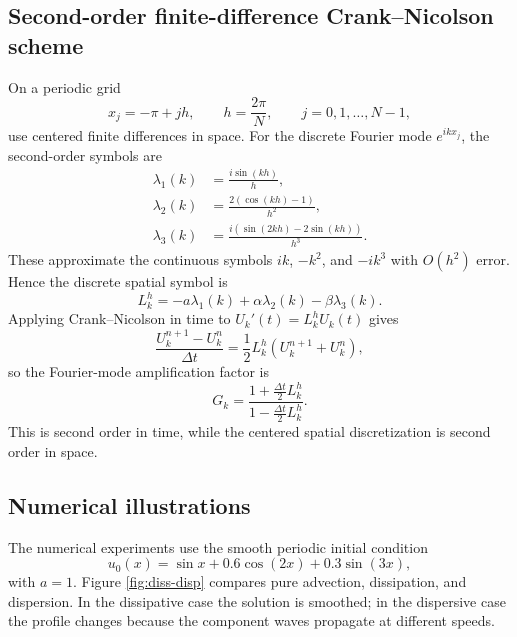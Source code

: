 \documentclass[11pt]{article}
\begin{document}
\subsection{Second-order finite-difference Crank--Nicolson scheme}

On a periodic grid
\begin{equation}
    x_j=-\pi+jh,\qquad h=\frac{2\pi}{N},\qquad j=0,1,\ldots,N-1,
\end{equation}
use centered finite differences in space.  For the discrete Fourier mode $e^{ikx_j}$, the second-order symbols are
\begin{align}
    \lambda_1(k)&=\frac{i\sin(kh)}{h},\\
    \lambda_2(k)&=\frac{2(\cos(kh)-1)}{h^2},\\
    \lambda_3(k)&=\frac{i(\sin(2kh)-2\sin(kh))}{h^3}.
\end{align}
These approximate the continuous symbols $ik$, $-k^2$, and $-ik^3$ with $O(h^2)$ error.  Hence the discrete spatial symbol is
\begin{equation}
    L_k^h=-a\lambda_1(k)+\alpha\lambda_2(k)-\beta\lambda_3(k).
\end{equation}
Applying Crank--Nicolson in time to $U_k'(t)=L_k^hU_k(t)$ gives
\begin{equation}
    \frac{U_k^{n+1}-U_k^n}{\Delta t}
    =
    \frac{1}{2}L_k^h\left(U_k^{n+1}+U_k^n\right),
\end{equation}
so the Fourier-mode amplification factor is
\begin{equation}
    G_k
    =
    \frac{1+\frac{\Delta t}{2}L_k^h}
         {1-\frac{\Delta t}{2}L_k^h}.
    \label{eq:cn-factor}
\end{equation}
This is second order in time, while the centered spatial discretization is second order in space.

\subsection{Numerical illustrations}

The numerical experiments use the smooth periodic initial condition
\begin{equation}
    u_0(x)=\sin x+0.6\cos(2x)+0.3\sin(3x),
\end{equation}
with $a=1$.  Figure \ref{fig:diss-disp} compares pure advection, dissipation, and dispersion.  In the dissipative case the solution is smoothed; in the dispersive case the profile changes because the component waves propagate at different speeds.
\end{document}
